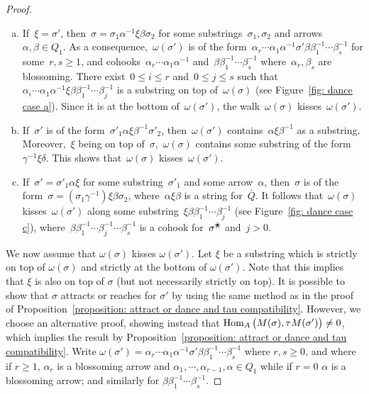 \documentclass{amsart}
\theoremstyle{definition}
\newcommand{\blossom}{^\text{\ding{96}}} %
\newcommand{\Hom}[1]{\operatorname{{\rm Hom}}_{#1}}
\begin{document}
\begin{proof}
\begin{enumerate}[(a)]
\item If~$\xi=\sigma'$, then~$\sigma = \sigma_1\alpha^{-1}\xi\beta\sigma_2$ for some substrings~$\sigma_1,\sigma_2$ and arrows~$\alpha,\beta\in Q_1$.
As a consequence,~$\omega(\sigma')$ is of the form~$\alpha_r\cdots\alpha_1\alpha^{-1}\sigma'\beta\beta_1^{-1}\cdots\beta_s^{-1}$ for some~$r,s\geq 1$, and cohooks~$\alpha_r\cdots\alpha_1\alpha^{-1}$ and~$\beta\beta_1^{-1}\cdots\beta_s^{-1}$ where~$\alpha_r,\beta_s$ are blossoming.
There exist~$0\leq i\leq r$ and~$0\leq j\leq s$ such that~$\alpha_i\cdots\alpha_1\alpha^{-1}\xi\beta\beta_1^{-1}\cdots\beta_j^{-1}$ is a substring on top of~$\omega(\sigma)$ (see Figure~\ref{fig: dance case a}).
Since it is at the bottom of~$\omega(\sigma')$, the walk~$\omega(\sigma)$ kisses~$\omega(\sigma')$.

\item If~$\sigma'$ is of the form~$\sigma'_1\alpha\xi\beta^{-1}\sigma'_2$, then~$\omega(\sigma')$ contains~$\alpha\xi\beta^{-1}$ as a substring.
Moreover,~$\xi$ being on top of~$\sigma$,~$\omega(\sigma)$ contains some substring of the form~$\gamma^{-1}\xi\delta$.
This shows that~$\omega(\sigma)$ kisses~$\omega(\sigma')$.

\item If~$\sigma'=\sigma'_1\alpha\xi$ for some substring~$\sigma'_1$ and some arrow~$\alpha$, then~$\sigma$ is of the form~$\sigma=(\sigma_1\gamma^{-1})\xi\beta\sigma_2$, where~$\alpha\xi\beta$ is a string for~$\bar Q$.
It follows that~$\omega(\sigma)$ kisses~$\omega(\sigma')$ along some substring~$\xi\beta\beta_1^{-1}\cdots\beta_j^{-1}$ (see Figure~\ref{fig: dance case c}), where~$\beta\beta_1^{-1}\cdots\beta_j^{-1}\cdots\beta_s^{-1}$ is a cohook for~$\sigma\blossom$ and~${j>0}$.
\end{enumerate}

We now assume that $\omega(\sigma)$ kisses $\omega(\sigma')$.
Let $\xi$ be a substring which is strictly on top of $\omega(\sigma)$ and strictly at the bottom of $\omega(\sigma')$.
Note that this implies that $\xi$ is also on top of $\sigma$ (but not necessarily strictly on top).
It is possible to show that $\sigma$ attracts or reaches for $\sigma'$ by using the same method as in the proof of Proposition~\ref{proposition: attract or dance and tau compatibility}.
However, we choose an alternative proof, showing instead that $\Hom{A} \big( M(\sigma), \tau M(\sigma') \big) \ne 0$, which implies the result by Proposition~\ref{proposition: attract or dance and tau compatibility}. 
Write $\omega(\sigma')=\alpha_r \cdots \alpha_1 \alpha^{-1} \sigma' \beta \beta_1^{-1} \cdots \beta_s^{-1}$ where $r,s\geq 0$, and where if $r\geq 1$, $\alpha_r$ is a blossoming arrow and $\alpha_1,\cdots,\alpha_{r-1},\alpha\in Q_1$ while if $r=0$ $\alpha$ is a blossoming arrow; and similarly for $\beta\beta_1^{-1}\cdots\beta_s^{-1}$.


\end{proof}
\end{document}
